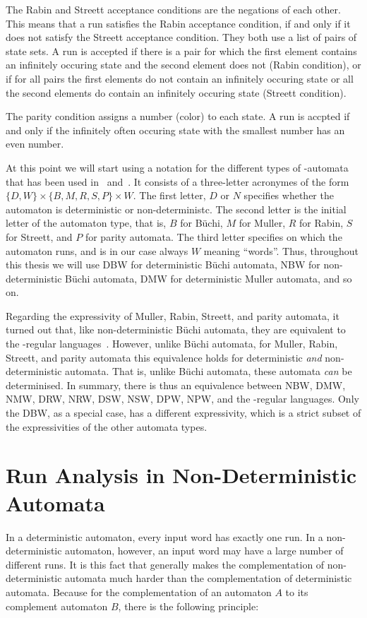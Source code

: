 The Rabin and Streett acceptance conditions are the negations of each other. This means that a run satisfies the Rabin acceptance condition, if and only if it does not satisfy the Streett acceptance condition. They both use a list of pairs of state sets. A run is accepted if there is a pair for which the first element contains an infinitely occuring state and the second element does not (Rabin condition), or if for all pairs the first elements do not contain an infinitely occuring state or all the second elements do contain an infinitely occuring state (Streett condition).

The parity condition assigns a number (color) to each state. A run is accpted if and only if the infinitely often occuring state with the smallest number has an even number.

At this point we will start using a notation for the different types of \om-automata that has been used in~\cite{2006_piterman} and~\cite{2011_tsai}. It consists of a three-letter acronymes of the form $\{D, W\} \times \{B, M, R, S, P\} \times W$. The first letter, $D$ or $N$ specifies whether the automaton is deterministic or non-deterministc. The second letter is the initial letter of the automaton type, that is, $B$ for Büchi, $M$ for Muller, $R$ for Rabin, $S$ for Streett, and $P$ for parity automata. The third letter specifies on which the automaton runs, and is in our case always $W$ meaning ``words''. Thus, throughout this thesis we will use DBW for deterministic Büchi automata, NBW for non-deterministic Büchi automata, DMW for deterministic Muller automata, and so on.

Regarding the expressivity of Muller, Rabin, Streett, and parity automata, it turned out that, like non-deterministic Büchi automata, they are equivalent to the \om-regular languages~\cite{Thomas:1991}. However, unlike Büchi automata, for Muller, Rabin, Streett, and parity automata this equivalence holds for deterministic \textit{and} non-deterministic automata. That is, unlike Büchi automata, these automata \textit{can} be determinised. In summary, there is thus an equivalence between NBW, DMW, NMW, DRW, NRW, DSW, NSW, DPW, NPW, and the \om-regular languages. Only the DBW, as a special case, has a different expressivity, which is a strict subset of the expressivities of the other automata types. 



\section{Run Analysis in Non-Deterministic Automata}
In a deterministic automaton, every input word has exactly one run. In a non-deterministic automaton, however, an input word may have a large number of different runs. It is this fact that generally makes the complementation of non-deterministic automata much harder than the complementation of deterministic automata. Because for the complementation of an automaton $A$ to its complement automaton $B$, there is the following principle:

